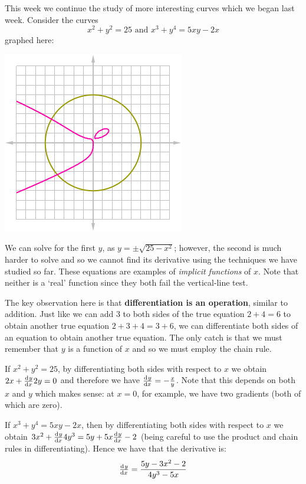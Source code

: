


This week we continue the study of more interesting curves which we began last week. Consider the curves
\begin{displaymath}
  x^2 + y^2 = 25 \text{ and } x^3 + y^4 = 5xy - 2x
\end{displaymath}
graphed here:
\begin{center}
  \includegraphics[width=0.3\linewidth]{implicit}
\end{center}
We can solve for the first $ y $, as $ y = \pm\sqrt{25 - x^2} $; however, the second is much harder
to solve and so we cannot find its derivative using the techniques we have studied so far. These equations
are examples of \textit{implicit functions} of $ x $. Note that neither is a `real' function since they both fail
the vertical-line test.

The key observation here is that \textbf{differentiation is an operation}, similar to addition. Just like
we can add 3 to both sides of the true equation $ 2 + 4 = 6 $ to obtain another true equation $ 2 + 3 + 4 = 3 + 6 $,
we can differentiate both sides of an equation to obtain another true equation. The only catch is that we must
remember that $ y $ is a function of $ x $ and so we must employ the chain rule.

\begin{ex}
  If $ x^2 + y^2 = 25 $, by differentiating both sides with respect to $ x $ we obtain $ 2x + \od{y}{x} 2y = 0 $ and therefore
  we have $ \od{y}{x} = -\frac{x}{y} $. Note that this depends on both $ x $ and $ y $ which makes sense:
  at $ x = 0 $, for example, we have two gradients (both of which are zero).
\end{ex}

\begin{ex}
  If $ x^3 + y^4 = 5xy - 2x $, then by differentiating both sides with respect to $ x $ we
  obtain $ 3x^2 + \od{y}{x} 4y^3 = 5y + 5x \od{y}{x} - 2 $ (being careful to use the product and chain rules in differentiating). Hence
  we have that the derivative is:
  \begin{displaymath}
    \od{y}{x} = \frac{5y - 3x^2 - 2}{4y^3 - 5x}
  \end{displaymath}
\end{ex}

